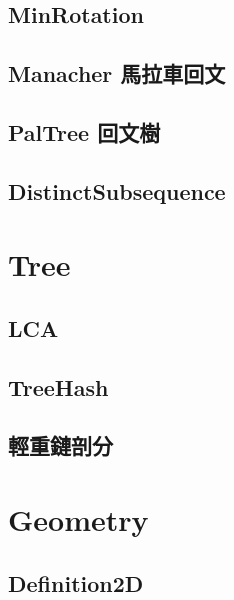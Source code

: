 \subsection{MinRotation}


\subsection{Manacher 馬拉車回文}


\subsection{PalTree 回文樹}


\subsection{DistinctSubsequence}

\section{Tree}

\subsection{LCA}


\subsection{TreeHash}


\subsection{輕重鏈剖分}

\section{Geometry}

\subsection{Definition2D}


